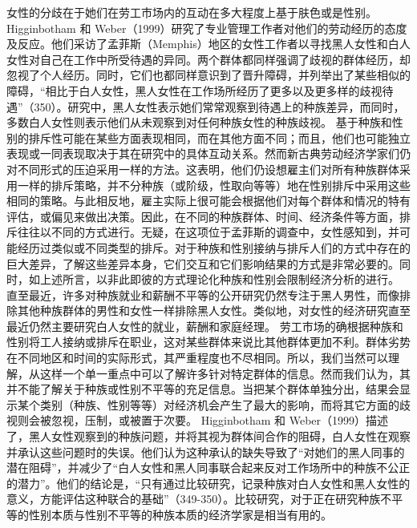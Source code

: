 \documentclass[UTF8]{ctexart}
\begin{document}
女性的分歧在于她们在劳工市场内的互动在多大程度上基于肤色或是性别。Higginbotham 和 Weber（1999）研究了专业管理工作者对他们的劳动经历的态度及反应。他们采访了孟菲斯（Memphis）地区的女性工作者以寻找黑人女性和白人女性对自己在工作中所受待遇的异同。两个群体都同样强调了歧视的群体经历，却忽视了个人经历。同时，它们也都同样意识到了晋升障碍，并列举出了某些相似的障碍，“相比于白人女性，黑人女性在工作场所经历了更多以及更多样的歧视待遇”（350）。研究中，黑人女性表示她们常常观察到待遇上的种族差异，而同时，多数白人女性则表示他们从未观察到对任何种族女性的种族歧视。
基于种族和性别的排斥性可能在某些方面表现相同，而在其他方面不同；而且，他们也可能独立表现或一同表现取决于其在研究中的具体互动关系。然而新古典劳动经济学家们仍对不同形式的压迫采用一样的方法。这表明，他们仍设想雇主们对所有种族群体采用一样的排斥策略，并不分种族（或阶级，性取向等等）地在性别排斥中采用这些相同的策略。与此相反地，雇主实际上很可能会根据他们对每个群体和情况的特有评估，或偏见来做出决策。因此，在不同的种族群体、时间、经济条件等方面，排斥往往以不同的方式进行。\cite{11}无疑，在这项位于孟菲斯的调查中，女性感知到，并可能经历过类似或不同类型的排斥。对于种族和性别接纳与排斥人们的方式中存在的巨大差异，了解这些差异本身，它们交互和它们影响结果的方式是非常必要的。同时，如上述所言，以非此即彼的方式理论化种族和性别会限制经济分析的进行。
直至最近，许多对种族就业和薪酬不平等的公开研究仍然专注于黑人男性，而像排除其他种族群体的男性和女性一样排除黑人女性。类似地，对女性的经济研究直至最近仍然主要研究白人女性的就业，薪酬和家庭经理。
劳工市场的确根据种族和性别将工人接纳或排斥在职业，这对某些群体来说比其他群体更加不利。群体劣势在不同地区和时间的实际形式，其严重程度也不尽相同。\cite{12}所以，我们当然可以理解，从这样一个单一重点中可以了解许多针对特定群体的信息。然而我们认为，其并不能了解关于种族或性别不平等的充足信息。当把某个群体单独分出，结果会显示某个类别（种族、性别等等）对经济机会产生了最大的影响，而将其它方面的歧视则会被忽视，压制，或被置于次要。
Higginbotham 和 Weber（1999）描述了，黑人女性观察到的种族问题，并将其视为群体间合作的阻碍，白人女性在观察并承认这些问题时的失误。他们认为这种承认的缺失导致了“对她们的黑人同事的潜在阻碍”，并减少了“白人女性和黑人同事联合起来反对工作场所中的种族不公正的潜力”。他们的结论是，“只有通过比较研究，记录种族对白人女性和黑人女性的意义，方能评估这种联合的基础”（349-350）。比较研究，对于正在研究种族不平等的性别本质与性别不平等的种族本质的经济学家是相当有用的。\cite{13}
\end{document}
